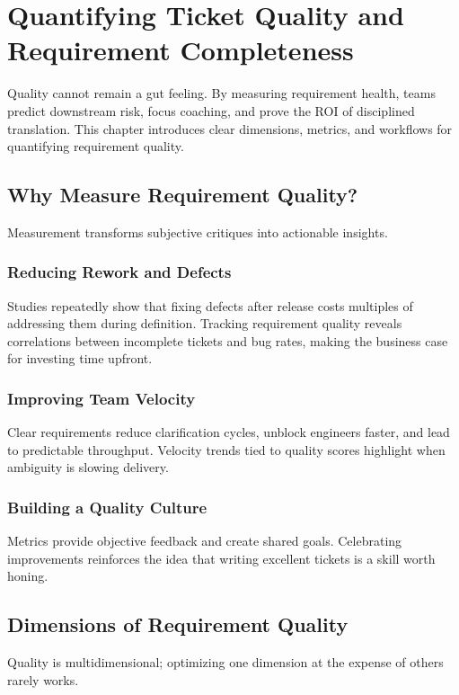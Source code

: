 \chapter{Quantifying Ticket Quality and Requirement Completeness}
\label{ch:quantifying-quality}

Quality cannot remain a gut feeling. By measuring requirement health, teams predict downstream risk, focus coaching, and prove the ROI of disciplined translation. This chapter introduces clear dimensions, metrics, and workflows for quantifying requirement quality.

\section{Why Measure Requirement Quality?}
\label{sec:why-measure}

Measurement transforms subjective critiques into actionable insights.

\subsection{Reducing Rework and Defects}
Studies repeatedly show that fixing defects after release costs multiples of addressing them during definition. Tracking requirement quality reveals correlations between incomplete tickets and bug rates, making the business case for investing time upfront.

\subsection{Improving Team Velocity}
Clear requirements reduce clarification cycles, unblock engineers faster, and lead to predictable throughput. Velocity trends tied to quality scores highlight when ambiguity is slowing delivery.

\subsection{Building a Quality Culture}
Metrics provide objective feedback and create shared goals. Celebrating improvements reinforces the idea that writing excellent tickets is a skill worth honing.

\section{Dimensions of Requirement Quality}
\label{sec:quality-dimensions}

Quality is multidimensional; optimizing one dimension at the expense of others rarely works.


